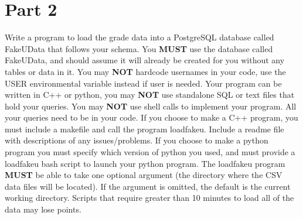 \documentclass{article}
\begin{document}
\section*{Part 2}
Write a program to load the grade data into a PostgreSQL database called FakeUData that follows your schema.
You {\bf MUST} use the database called FakeUData, and should assume it will already be created for you without any tables or data in it.
You may {\bf NOT} hardcode usernames in your code, use the USER environmental variable instead if user is needed.
Your program can be written in C++ or python, you may {\bf NOT} use standalone SQL or text files that hold your queries.
You may {\bf NOT} use shell calls to implement your program.
All your queries need to be in your code.
If you choose to make a C++ program, you must include a makefile and call the program loadfakeu.
Include a readme file with descriptions of any issues/problems.
If you choose to make a python program you must specify which version of python you used, and must provide a loadfakeu bash script to launch your python program.
The loadfakeu program {\bf MUST} be able to take one optional argument (the directory where the CSV data files will be located).
If the argument is omitted, the default is the current working directory.
Scripts that require greater than 10 minutes to load all of the data may lose points.
\clearpage
\end{document}

